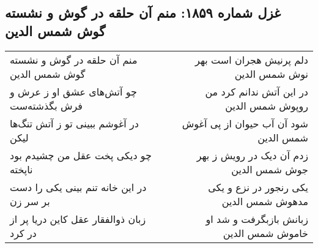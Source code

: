 \begin{center}
\section*{غزل شماره ۱۸۵۹: منم آن حلقه در گوش و نشسته گوش شمس الدین}
\label{sec:1859}
\begin{longtable}{l p{0.5cm} r}
منم آن حلقه در گوش و نشسته گوش شمس الدین
&&
دلم پرنیش هجران است بهر نوش شمس الدین
\\
چو آتش‌های عشق او ز عرش و فرش بگذشته‌ست
&&
در این آتش ندانم کرد من روپوش شمس الدین
\\
در آغوشم ببینی تو ز آتش تنگ‌ها لیکن
&&
شود آن آب حیوان از پی آغوش شمس الدین
\\
چو دیکی پخت عقل من چشیدم بود ناپخته
&&
زدم آن دیک در رویش ز بهر جوش شمس الدین
\\
در این خانه تنم بینی یکی را دست بر سر زن
&&
یکی رنجور در نزع و یکی مدهوش شمس الدین
\\
زبان ذوالفقار عقل کاین دریا پر از در کرد
&&
زبانش بازبگرفت و شد او خاموش شمس الدین
\\
\end{longtable}
\end{center}
